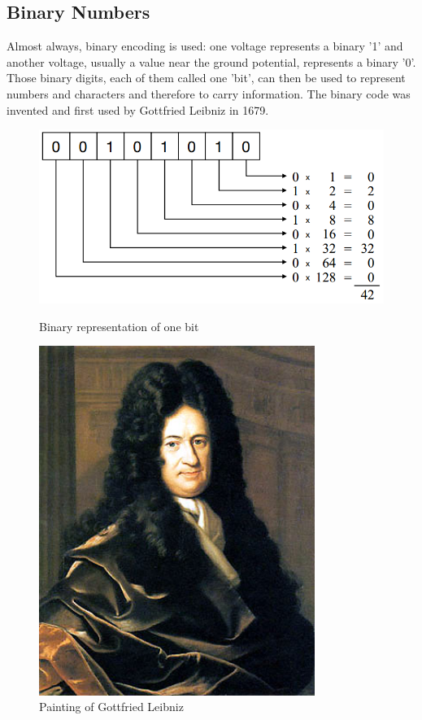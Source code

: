 \documentclass[10pt,a4paper]{article}
\begin{document}
\subsection{Binary Numbers}
Almost always, binary encoding is used: one voltage represents a binary '1' and another voltage, usually a value near the ground potential, represents a binary '0'. Those binary digits, each of them called one 'bit', can then be used to represent numbers and characters and therefore to carry information. The binary code was invented and first used by Gottfried Leibniz in 1679.

\begin{figure}[H]
\centering
\begin{minipage}{0.5\textwidth}
  \includegraphics[width=1\textwidth]{binary.png}%
  \caption{Binary representation of one bit}%
  \label{fig:binary}
\end{minipage}%
\begin{minipage}{.4\textwidth}
  \centering
  \includegraphics[width=0.8\textwidth]{leibniz}%
  \caption{Painting of Gottfried Leibniz}%
  \label{fig:leibniz}
\end{minipage}
\end{figure}
\end{document}
